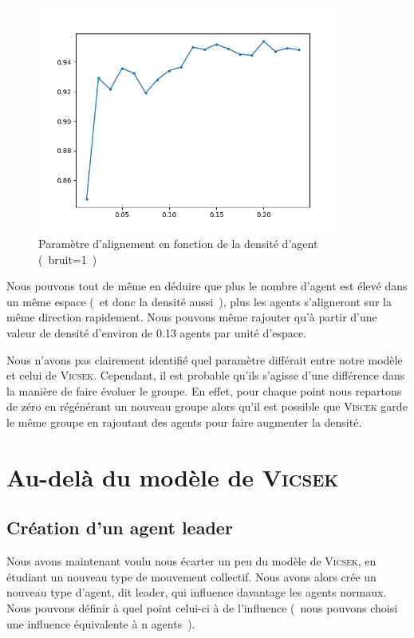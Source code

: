 \documentclass[french, a4paper, 12pt, openany]{report}
\begin{document}
       \begin{figure}[!h]
		\centering
		\includegraphics[width=10cm]{images/densite_1[noise=1].png}
		\caption{Paramètre d'alignement en fonction de la densité d'agent (~bruit=1~)}
		\label{densité_alignement}
	\end{figure}
	
	Nous pouvons tout de même en déduire que plus le nombre d'agent est élevé dans un même espace (~et donc la densité aussi~), plus les agents s'aligneront sur la même direction rapidement. Nous pouvons même rajouter qu'à partir d'une valeur de densité d'environ de 0.13 agents par unité d'espace. 
	
	Nous n'avons pas clairement identifié quel paramètre différait entre notre modèle et celui de \textsc{Vicsek}. Cependant, il est probable qu'ils s'agisse d'une différence dans la manière de faire évoluer le groupe. En effet, pour chaque point nous repartons de zéro en régénérant un nouveau groupe alors qu'il est possible que \textsc{Viscek} garde le même groupe en rajoutant des agents pour faire augmenter la densité.
    \newpage
    \section{Au-delà du modèle de \textsc{Vicsek}}
    \subsection{Création d'un agent leader}
       Nous avons maintenant voulu nous écarter un peu du modèle de \textsc{Vicsek}, en étudiant un nouveau type de mouvement collectif. Nous avons alors crée un nouveau type d'agent, dit leader, qui influence davantage les agents normaux. Nous pouvons définir à quel point celui-ci à de l'influence (~nous pouvons choisi une influence équivalente à n agents~).\\
       
\end{document}
